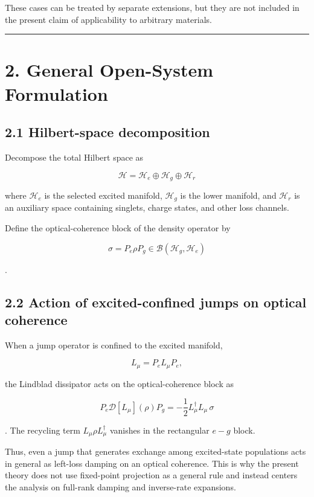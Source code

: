\documentclass[
  10pt,
  a4paper,
]{article}
\begin{document}
These cases can be treated by separate extensions, but they are not
included in the present claim of applicability to arbitrary materials.

\begin{center}\rule{0.5\linewidth}{0.5pt}\end{center}

\section{2. General Open-System
Formulation}\label{general-open-system-formulation}

\subsection{2.1 Hilbert-space
decomposition}\label{hilbert-space-decomposition}

Decompose the total Hilbert space as

\[
\mathcal H=\mathcal H_e\oplus\mathcal H_g\oplus\mathcal H_r
\]

where \(\mathcal H_e\) is the selected excited manifold,
\(\mathcal H_g\) is the lower manifold, and \(\mathcal H_r\) is an
auxiliary space containing singlets, charge states, and other loss
channels.

Define the optical-coherence block of the density operator by

\[
\sigma=P_e\rho P_g\in\mathcal B(\mathcal H_g,\mathcal H_e)
\]

.

\subsection{2.2 Action of excited-confined jumps on optical
coherence}\label{action-of-excited-confined-jumps-on-optical-coherence}

When a jump operator is confined to the excited manifold,

\[
L_\mu=P_eL_\mu P_e,
\]

the Lindblad dissipator acts on the optical-coherence block as

\[
P_e\mathcal D[L_\mu](\rho)P_g
=-\frac12L_\mu^\dagger L_\mu\,\sigma
\]

. The recycling term \(L_\mu\rho L_\mu^\dagger\) vanishes in the
rectangular \(e-g\) block.

Thus, even a jump that generates exchange among excited-state
populations acts in general as left-loss damping on an optical
coherence. This is why the present theory does not use fixed-point
projection as a general rule and instead centers the analysis on
full-rank damping and inverse-rate expansions.
\end{document}
